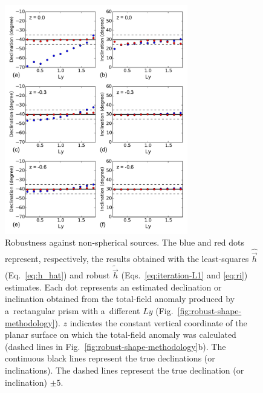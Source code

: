 \documentclass[journal abbreviation, npg]{copernicus}
\begin{document}
\begin{figure}[t]
\includegraphics[width=80mm]{Figures/npgd-2014-0069-f06}
\caption{Robustness against non-spherical sources. The blue and red
  dots represent, respectively, the results obtained with the
  least-squares $\hat{\vec{h}}$ (Eq.~\ref{eq:h_hat}) and robust
  $\tilde{\vec{h}}$ (Eqs.~\ref{eq:iteration-L1} and \ref{eq:ri})
  estimates. Each dot represents an estimated declination or
  inclination obtained from the total-field anomaly produced by
  a~rectangular prism with a~different $Ly$
  (Fig.~\ref{fig:robust-shape-methodology}). $z$ indicates the constant
  vertical coordinate of the planar surface on which the total-field
  anomaly was calculated (dashed lines in
  Fig.~\ref{fig:robust-shape-methodology}b). The continuous black
  lines represent the true declinations (or inclinations). The dashed
  lines represent the true declination (or inclination) $\pm
  5${\degree}.}
\label{fig:robust-shape-results}
\end{figure}

\end{document}
